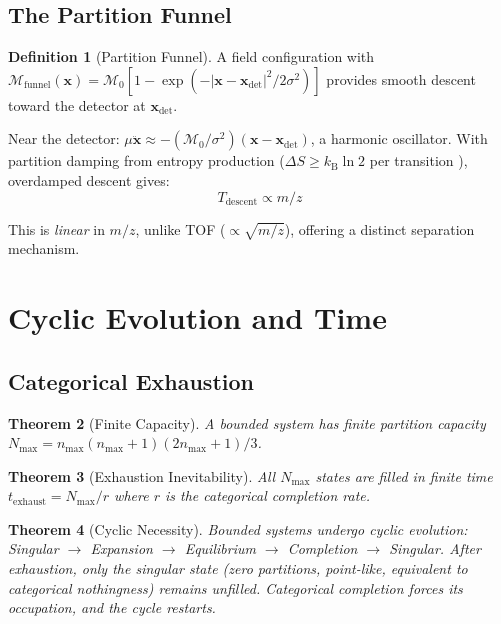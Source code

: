 \documentclass[twocolumn,10pt,a4paper]{article}
\newtheorem{theorem}{Theorem}[section]
\theoremstyle{definition}
\newtheorem{definition}[theorem]{Definition}
\theoremstyle{remark}
\newcommand{\kB}{k_{\mathrm{B}}}
\newcommand{\Depth}{\mathcal{M}}
\newcommand{\partinert}{\mu}
\newcommand{\xdet}{\mathbf{x}_{\mathrm{det}}}
\begin{document}
\subsection{The Partition Funnel}

\begin{definition}[Partition Funnel]
A field configuration with $\Depth_{\text{funnel}}(\mathbf{x}) = \Depth_0[1 - \exp(-|\mathbf{x} - \xdet|^2/2\sigma^2)]$ provides smooth descent toward the detector at $\xdet$.
\end{definition}

Near the detector: $\partinert\ddot{\mathbf{x}} \approx -(\Depth_0/\sigma^2)(\mathbf{x} - \xdet)$, a harmonic oscillator. With partition damping from entropy production ($\Delta S \geq \kB\ln 2$ per transition \citep{landauer1961}), overdamped descent gives:
\begin{equation}
    T_{\text{descent}} \propto m/z
\end{equation}

This is \emph{linear} in $m/z$, unlike TOF ($\propto\sqrt{m/z}$), offering a distinct separation mechanism.

\section{Cyclic Evolution and Time}
\label{sec:cyclic}

\subsection{Categorical Exhaustion}

\begin{theorem}[Finite Capacity]
A bounded system has finite partition capacity $N_{\max} = n_{\max}(n_{\max}+1)(2n_{\max}+1)/3$.
\end{theorem}

\begin{theorem}[Exhaustion Inevitability]
\label{thm:exhaustion}
All $N_{\max}$ states are filled in finite time $t_{\text{exhaust}} = N_{\max}/r$ where $r$ is the categorical completion rate.
\end{theorem}

\begin{theorem}[Cyclic Necessity]
\label{thm:cyclic}
Bounded systems undergo cyclic evolution: Singular $\to$ Expansion $\to$ Equilibrium $\to$ Completion $\to$ Singular. After exhaustion, only the singular state (zero partitions, point-like, equivalent to categorical nothingness) remains unfilled. Categorical completion forces its occupation, and the cycle restarts.
\end{theorem}
\end{document}
